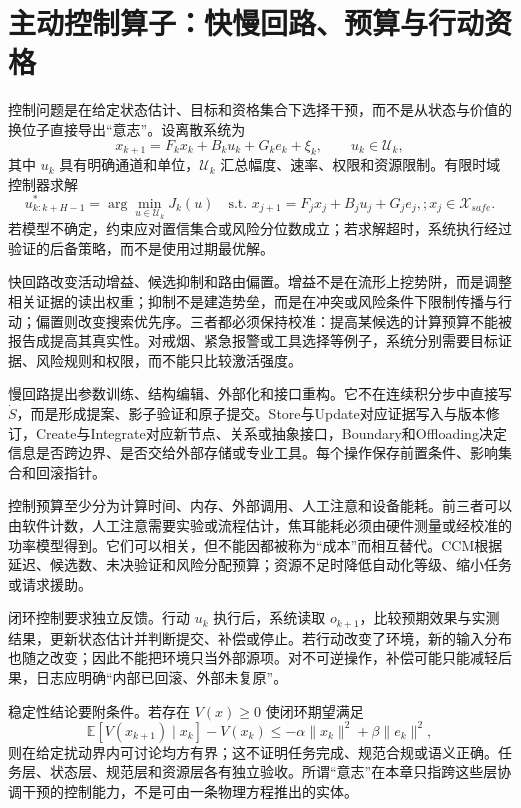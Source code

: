 \section{主动控制算子：快慢回路、预算与行动资格}
\label{sec:section_9657}

控制问题是在给定状态估计、目标和资格集合下选择干预，而不是从状态与价值的换位子直接导出“意志”。设离散系统为
\begin{equation}
x_{k+1}=F_kx_k+B_ku_k+G_ke_k+\xi_k,\qquad u_k\in\mathcal U_k,
\end{equation}
其中 $u_k$ 具有明确通道和单位，$\mathcal U_k$ 汇总幅度、速率、权限和资源限制。有限时域控制器求解
\begin{equation}
u^*_{k:k+H-1}=\arg\min_{u\in\mathcal U_k}J_k(u)\quad
\text{s.t. }x_{j+1}=F_jx_j+B_ju_j+G_je_j,;x_j\in\mathcal X_{safe}.
\end{equation}
若模型不确定，约束应对置信集合或风险分位数成立；若求解超时，系统执行经过验证的后备策略，而不是使用过期最优解。

快回路改变活动增益、候选抑制和路由偏置。增益不是在流形上挖势阱，而是调整相关证据的读出权重；抑制不是建造势垒，而是在冲突或风险条件下限制传播与行动；偏置则改变搜索优先序。三者都必须保持校准：提高某候选的计算预算不能被报告成提高其真实性。对戒烟、紧急报警或工具选择等例子，系统分别需要目标证据、风险规则和权限，而不能只比较激活强度。

慢回路提出参数训练、结构编辑、外部化和接口重构。它不在连续积分步中直接写 $\dot S$，而是形成提案、影子验证和原子提交。Store与Update对应证据写入与版本修订，Create与Integrate对应新节点、关系或抽象接口，Boundary和Offloading决定信息是否跨边界、是否交给外部存储或专业工具。每个操作保存前置条件、影响集合和回滚指针。

控制预算至少分为计算时间、内存、外部调用、人工注意和设备能耗。前三者可以由软件计数，人工注意需要实验或流程估计，焦耳能耗必须由硬件测量或经校准的功率模型得到。它们可以相关，但不能因都被称为“成本”而相互替代。CCM根据延迟、候选数、未决验证和风险分配预算；资源不足时降低自动化等级、缩小任务或请求援助。

闭环控制要求独立反馈。行动 $u_k$ 执行后，系统读取 $o_{k+1}$，比较预期效果与实测结果，更新状态估计并判断提交、补偿或停止。若行动改变了环境，新的输入分布也随之改变；因此不能把环境只当外部源项。对不可逆操作，补偿可能只能减轻后果，日志应明确“内部已回滚、外部未复原”。

稳定性结论要附条件。若存在 $V(x)\ge0$ 使闭环期望满足
\begin{equation}
\mathbb E[V(x_{k+1})\mid x_k]-V(x_k)\le-\alpha\|x_k\|^2+\beta\|e_k\|^2,
\end{equation}
则在给定扰动界内可讨论均方有界；这不证明任务完成、规范合规或语义正确。任务层、状态层、规范层和资源层各有独立验收。所谓“意志”在本章只指跨这些层协调干预的控制能力，不是可由一条物理方程推出的实体。

